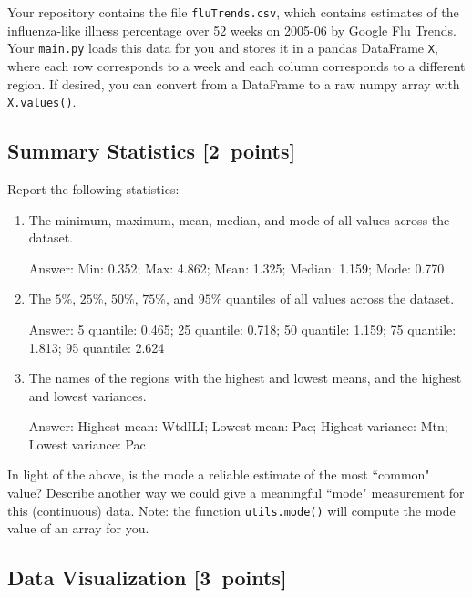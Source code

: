 \documentclass{article}
\newcommand{\blu}[1]{{\textcolor{blu}{#1}}}
\newenvironment{answer}{\par\begingroup\color{gre}Answer: }{\endgroup}
\let\ask\blu
\newcommand\pts[1]{\textcolor{pointscolour}{[#1~points]}}
\begin{document}
  Your repository contains the file \texttt{fluTrends.csv}, which contains estimates
  of the influenza-like illness percentage over 52 weeks on 2005-06 by Google Flu Trends.
  Your \texttt{main.py} loads this data for you and stores it in a pandas DataFrame \texttt{X},
  where each row corresponds to a week and each column
  corresponds to a different
  region. If desired, you can convert from a DataFrame to a raw numpy array with \texttt{X.values()}.

  \subsection{Summary Statistics \pts{2}}

  \ask{Report the following statistics}:
  \begin{enumerate}
  \item The minimum, maximum, mean, median, and mode of all values across the dataset.
  \begin{answer}
    Min: 0.352; Max: 4.862; Mean: 1.325; Median: 1.159; Mode: 0.770
  \end{answer}
  \item The $5\%$, $25\%$, $50\%$, $75\%$, and $95\%$ quantiles of all values across the dataset.
  \begin{answer}
    5 quantile: 0.465; 25 quantile: 0.718; 50 quantile: 1.159; 75 quantile: 1.813; 95 quantile: 2.624
  \end{answer}

  \item The names of the regions with the highest and lowest means, and the highest and lowest variances.%
  \begin{answer}
    Highest mean: WtdILI; Lowest mean: Pac; Highest variance: Mtn; Lowest variance: Pac 
  \end{answer}
  \end{enumerate}
  In light of the above, \ask{is the mode a reliable estimate of the most ``common" value? Describe another way we could give a meaningful ``mode" measurement for this (continuous) data.} Note: the function \texttt{utils.mode()} will compute the mode value of an array for you.


  


  \subsection{Data Visualization \pts{3}}
\end{document}
